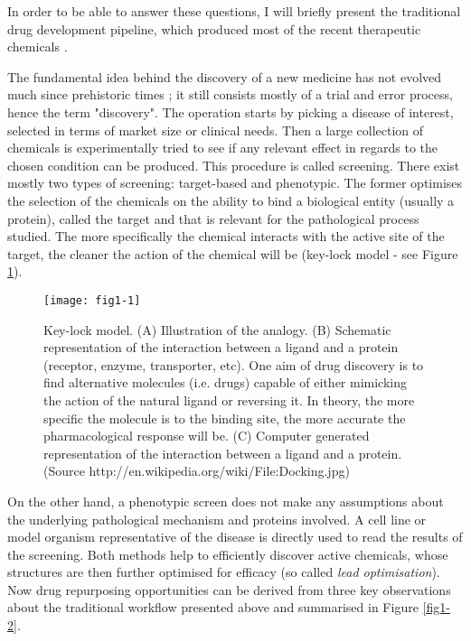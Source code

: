 In order to be able to answer these questions, I will briefly present the traditional drug development pipeline, which produced most of the recent therapeutic chemicals \citep{swinney2011were}.

The fundamental idea behind the discovery of a new medicine has not evolved much since prehistoric times \citep{prehistoricwiki}; it still consists mostly of a trial and error process, hence the term "discovery". The operation starts by picking a disease of interest, selected in terms of market size or clinical needs. Then a large collection of chemicals is experimentally tried to see if any relevant effect in regards to the chosen condition can be produced. This procedure is called screening. There exist mostly two types of screening: target-based and phenotypic. The former optimises the selection of the chemicals on the ability to bind a biological entity (usually a protein), called the target and that is relevant for the pathological process studied. The more specifically the chemical interacts with the active site of the target, the cleaner the action of the chemical will be (key-lock model - see Figure \ref{fig1-1}).

\begin{figure}[ht]
    \centering
    \texttt{[image: fig1-1]}
    \caption{Key-lock model. (A) Illustration of the analogy. (B) Schematic representation of the interaction between a ligand and a protein (receptor, enzyme, transporter, etc). One aim of drug discovery is to find alternative molecules (i.e. drugs) capable of either mimicking the action of the natural ligand or reversing it. In theory, the more specific the molecule is to the binding site, the more accurate the pharmacological response will be. (C) Computer generated representation of the interaction between a ligand and a protein. (Source http://en.wikipedia.org/wiki/File:Docking.jpg)}
    \label{fig1-1}
\end{figure}

On the other hand, a phenotypic screen does not make any assumptions about the underlying pathological mechanism and proteins involved. A cell line or model organism representative of the disease is directly used to read the results of the screening. Both methods help to efficiently discover active chemicals, whose structures are then further optimised for efficacy (so called \emph{lead optimisation}). Now drug repurposing opportunities can be derived from three key observations \citep{barratt2012drug} about the traditional workflow presented above and summarised in Figure \ref{fig1-2}.

